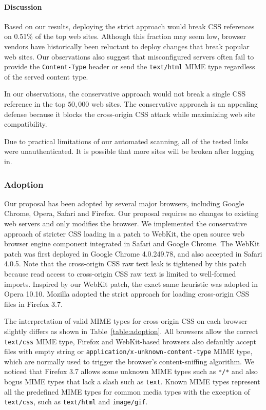 \documentclass{acm_proc_article-sp}
\begin{document}
\paragraph{Discussion}
Based on our results, deploying the strict approach would break CSS references on 0.51\% of the top web sites. Although this fraction may seem low, browser vendors have historically been reluctant to deploy changes that break popular web sites. Our observations also suggest that misconfigured servers often fail to provide the \texttt{Content-Type} header or send the \texttt{text/html} MIME type regardless of the served content type.

In our observations, the conservative approach would not break a single CSS reference in the top $50,000$ web sites. The conservative approach is an appealing defense because it blocks the cross-origin CSS attack while maximizing web site compatibility.

Due to practical limitations of our automated scanning, all of the tested links were unauthenticated. It is possible that more sites will be broken after logging in.

\subsubsection{Adoption}
Our proposal has been adopted by several major browsers, including Google Chrome, Opera, Safari and Firefox. Our proposal requires no changes to existing web servers and only modifies the browser. We implemented the conservative approach of stricter CSS loading in a patch to WebKit, the open source web browser engine component integrated in Safari and Google Chrome. The WebKit patch was first deployed in Google Chrome 4.0.249.78, and also accepted in Safari 4.0.5. Note that the cross-origin CSS raw text leak is tightened by this patch because read access to cross-origin CSS raw text is limited to well-formed imports. Inspired by our WebKit patch, the exact same heuristic was adopted in Opera 10.10. Mozilla adopted the strict approach for loading cross-origin CSS files in Firefox 3.7.

The interpretation of valid MIME types for cross-origin CSS on each browser slightly differs as shown in Table~\ref{table:adoption}. All browsers allow the correct \texttt{text/css} MIME type, Firefox and WebKit-based browsers also defaultly accept files with empty string or \texttt{application/x-unknown-content-type} MIME type, which are normally used to trigger the browser's content-sniffing algorithm. We noticed that Firefox 3.7 allows some unknown MIME types such as \texttt{*/*} and also bogus MIME types that lack a slash such as \texttt{text}. Known MIME types represent all the predefined MIME types for common media types with the exception of \texttt{text/css}, such as \texttt{text/html} and \texttt{image/gif}.
\end{document}
